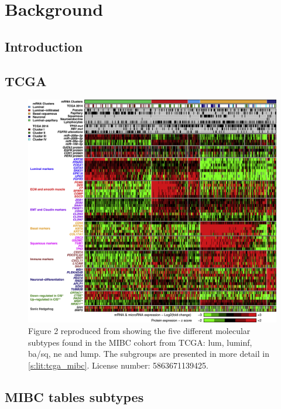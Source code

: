 \chapter{Background} \label{s:ap:intro}

\section{Introduction}

\section{TCGA}

\begin{figure}[!htb]    
    \centering
\includegraphics[width=1.0\textwidth,keepaspectratio]{Sections/Lit_review/Resources/TCGA_2017_subtypes.jpg}
    \caption[Summary of the TCGA subgroups]{Figure 2 reproduced from \citet{Robertson2017-mg} showing the five different molecular subtypes found in the MIBC cohort from TCGA: \acrfull{lum}, \acrfull{luminf}, \acrfull{ba/sq}, \acrfull{ne} and \acrfull{lump}. The subgroups are presented in more detail in \cref{s:lit:tcga_mibc}. License number: 5863671139425.}
    \label{fig:ap:tcga_subtypes}
\end{figure}

\newpage
\section{MIBC tables subtypes}

